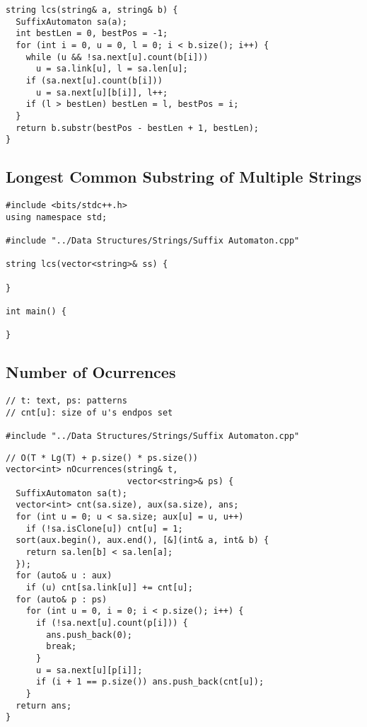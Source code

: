 \documentclass[twoside]{article}
\begin{document}
\begin{multicols*}{2}
\begin{verbatim}
string lcs(string& a, string& b) {
  SuffixAutomaton sa(a);
  int bestLen = 0, bestPos = -1;
  for (int i = 0, u = 0, l = 0; i < b.size(); i++) {
    while (u && !sa.next[u].count(b[i]))
      u = sa.link[u], l = sa.len[u];
    if (sa.next[u].count(b[i]))
      u = sa.next[u][b[i]], l++;
    if (l > bestLen) bestLen = l, bestPos = i;
  }
  return b.substr(bestPos - bestLen + 1, bestLen);
}
\end{verbatim}

\subsectionfont{\large\bfseries\sffamily\underline}
\subsection*{Longest Common Substring of Multiple Strings}
\begin{verbatim}
#include <bits/stdc++.h>
using namespace std;

#include "../Data Structures/Strings/Suffix Automaton.cpp"

string lcs(vector<string>& ss) {
  
}

int main() {

}
\end{verbatim}

\subsectionfont{\large\bfseries\sffamily\underline}
\subsection*{Number of Ocurrences}
\begin{verbatim}
// t: text, ps: patterns
// cnt[u]: size of u's endpos set

#include "../Data Structures/Strings/Suffix Automaton.cpp"
\end{verbatim}
\vspace{-12pt}
\begin{verbatim}
// O(T * Lg(T) + p.size() * ps.size())
vector<int> nOcurrences(string& t,
                        vector<string>& ps) {
  SuffixAutomaton sa(t);
  vector<int> cnt(sa.size), aux(sa.size), ans;
  for (int u = 0; u < sa.size; aux[u] = u, u++)
    if (!sa.isClone[u]) cnt[u] = 1;
  sort(aux.begin(), aux.end(), [&](int& a, int& b) {
    return sa.len[b] < sa.len[a];
  });
  for (auto& u : aux)
    if (u) cnt[sa.link[u]] += cnt[u];
  for (auto& p : ps)
    for (int u = 0, i = 0; i < p.size(); i++) {
      if (!sa.next[u].count(p[i])) {
        ans.push_back(0);
        break;
      }
      u = sa.next[u][p[i]];
      if (i + 1 == p.size()) ans.push_back(cnt[u]);
    }
  return ans;
}
\end{verbatim}


\end{multicols*}
\end{document}
